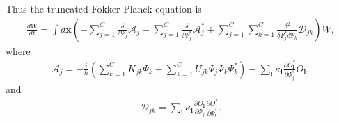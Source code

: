 \documentclass[12pt,aip,jmp,amssymb,amsmath]{revtex4-1}
\newcommand{\lvec}{\boldsymbol{l}}
\newcommand{\xvec}{\boldsymbol{x}}
\begin{document}
Thus the truncated Fokker-Planck equation is
\begin{equation}\begin{split}
    \frac{dW}{dt}
    = \int d\xvec \left(
        - \sum_{j=1}^C \frac{\delta}{\delta \Psi_j} \mathcal{A}_j
        - \sum_{j=1}^C \frac{\delta}{\delta \Psi_j^*} \mathcal{A}_j^*
        + \sum_{j=1}^C \sum_{k=1}^C \frac{\delta^2}{\delta \Psi_j^* \delta \Psi_k} \mathcal{D}_{jk}
    \right) W,
\end{split}\end{equation}
where
\begin{equation}\begin{split}
    \mathcal{A}_j = -\frac{i}{\hbar} \left(
            \sum_{k=1}^C K_{jk} \Psi_k
            + \sum_{k=1}^C U_{jk} \Psi_j \Psi_k \Psi_k^*
        \right)
        - \sum_{\lvec} \kappa_{\lvec} \frac{\partial O_{\lvec}^*}{\partial \Psi_j^*} O_{\lvec},
\end{split}\end{equation}
and
\begin{equation}\begin{split}
    \mathcal{D}_{jk} = \sum_{\lvec} \kappa_{\lvec}
        \frac{\partial O_{\lvec}}{\partial \Psi_j}
        \frac{\partial O_{\lvec}^*}{\partial \Psi_k^*}.
\end{split}\end{equation}
\end{document}
